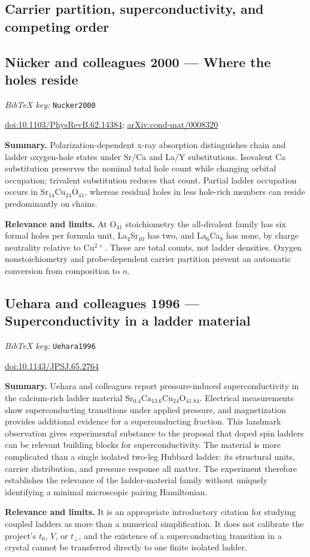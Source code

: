 \documentclass[11pt]{article}
\newcommand{\paper}[2]{\Needspace{8\baselineskip}\subsection{#2}\label{paper:#1}\textit{BibTeX key:} \texttt{#1}\quad\citep{#1}\par}
\newcommand{\doi}[1]{\href{https://doi.org/#1}{doi:#1}}
\newcommand{\arxiv}[1]{\href{https://arxiv.org/abs/#1}{arXiv:#1}}
\newcommand{\summary}{\par\textbf{Summary.} }
\newcommand{\relevance}{\par\textbf{Relevance and limits.} }
\begin{document}
\subsection*{Carrier partition, superconductivity, and competing order}

\paper{Nucker2000}{N\"ucker and colleagues 2000 --- Where the holes reside}
\doi{10.1103/PhysRevB.62.14384}; \arxiv{cond-mat/0008320}
\summary Polarization-dependent x-ray absorption distinguishes chain and ladder oxygen-hole states under Sr/Ca and La/Y substitutions. Isovalent Ca substitution preserves the nominal total hole count while changing orbital occupation; trivalent substitution reduces that count. Partial ladder occupation occurs in Sr$_{14}$Cu$_{24}$O$_{41}$, whereas residual holes in less hole-rich members can reside predominantly on chains.
\relevance At O$_{41}$ stoichiometry the all-divalent family has six formal holes per formula unit, La$_4$Sr$_{10}$ has two, and La$_6$Ca$_8$ has none, by charge neutrality relative to Cu$^{2+}$. These are total counts, not ladder densities. Oxygen nonstoichiometry and probe-dependent carrier partition prevent an automatic conversion from composition to $n$.

\paper{Uehara1996}{Uehara and colleagues 1996 --- Superconductivity in a ladder material}
\doi{10.1143/JPSJ.65.2764}
\summary Uehara and colleagues report pressure-induced superconductivity in the calcium-rich ladder material $\mathrm{Sr}_{0.4}\mathrm{Ca}_{13.6}\mathrm{Cu}_{24}\mathrm{O}_{41.84}$. Electrical measurements show superconducting transitions under applied pressure, and magnetization provides additional evidence for a superconducting fraction. This landmark observation gives experimental substance to the proposal that doped spin ladders can be relevant building blocks for superconductivity. The material is more complicated than a single isolated two-leg Hubbard ladder: its structural units, carrier distribution, and pressure response all matter. The experiment therefore establishes the relevance of the ladder-material family without uniquely identifying a minimal microscopic pairing Hamiltonian.
\relevance It is an appropriate introductory citation for studying coupled ladders as more than a numerical simplification. It does not calibrate the project's $t_0$, $V$, or $t_\perp$, and the existence of a superconducting transition in a crystal cannot be transferred directly to one finite isolated ladder.
\end{document}
